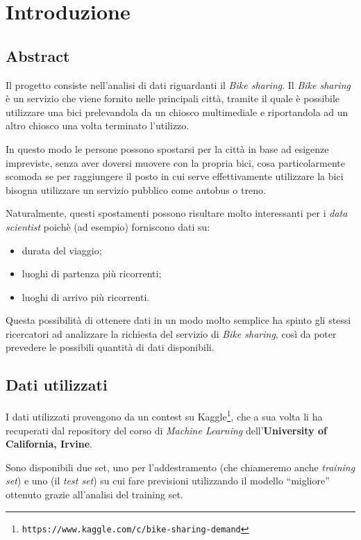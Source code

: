 \section{Introduzione}

\subsection{Abstract}\label{sec:intro-abstract}
Il progetto consiste nell'analisi di dati riguardanti il \emph{Bike sharing}.
Il \emph{Bike sharing} è un servizio che viene fornito nelle principali città,
tramite il quale è possibile utilizzare una bici prelevandola da un chiosco
multimediale e riportandola ad un altro chiosco una volta terminato l'utilizzo.

In questo modo le persone possono spostarsi per la città in base ad esigenze
impreviste, senza aver doversi muovere con la propria bici, cosa
particolarmente scomoda se per raggiungere il posto in cui serve
effettivamente utilizzare la bici bisogna utilizzare un servizio pubblico come
autobus o treno.

Naturalmente, questi spostamenti possono risultare molto interessanti per i
\emph{data scientist} poichè (ad esempio) forniscono dati su:

\begin{itemize}
\item durata del viaggio;
\item luoghi di partenza più ricorrenti;
\item luoghi di arrivo più ricorrenti.
\end{itemize}

Questa possibilità di ottenere dati in un modo molto semplice ha spinto gli
stessi ricercatori ad analizzare la richiesta del servizio di \emph{Bike
sharing}, così da poter prevedere le possibili quantità di dati disponibili.

\subsection{Dati utilizzati}\label{sec:intro-dati}

I dati utilizzati provengono da un contest su
Kaggle\footnote{\texttt{https://www.kaggle.com/c/bike-sharing-demand}},
che a sua volta li ha recuperati dal repository del corso di
\emph{Machine Learning} dell'\textbf{University of California, Irvine}.

Sono disponibili due set, uno per l'addestramento (che chiameremo anche
\emph{training set}) e uno (il \emph{test set}) su cui fare previsioni
utilizzando il modello ``migliore'' ottenuto grazie all'analisi del training
set.

